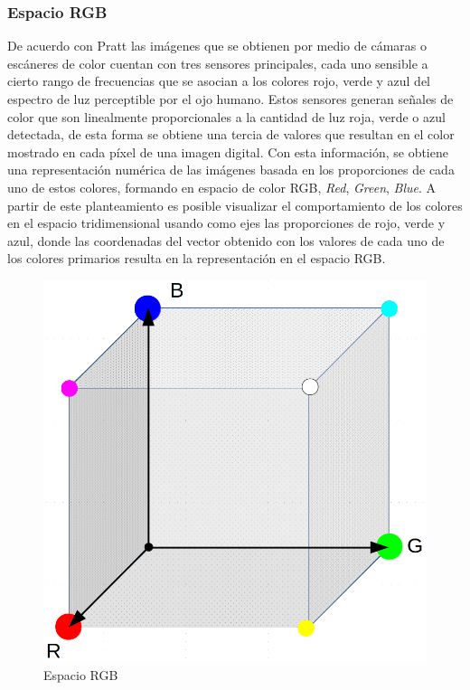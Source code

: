 \subsubsection{Espacio RGB}
De acuerdo con Pratt \cite{pratt_introduction_2014} las imágenes que se obtienen por medio de cámaras o escáneres de color cuentan con tres sensores principales, cada uno sensible a cierto rango de frecuencias que se asocian a los colores rojo, verde y azul del espectro de luz perceptible por el ojo humano. Estos sensores generan señales de color que son linealmente proporcionales a la cantidad de luz roja, verde o azul  detectada, de esta forma se obtiene una tercia de valores que resultan en el color mostrado en cada píxel de una imagen digital. Con esta información, se obtiene una representación numérica de las imágenes basada en los proporciones de cada uno de estos colores, formando en espacio de color RGB, \textit{Red}, \textit{Green}, \textit{Blue}. A partir de este planteamiento es posible visualizar el comportamiento de los colores en el espacio tridimensional usando como ejes las proporciones de rojo, verde y azul, donde las coordenadas del vector obtenido con los valores de cada uno de los colores primarios resulta en la representación en el espacio RGB.

\begin{figure}[H]
\centering
\includegraphics[scale=0.18]{Figures/CuboRGB.png}
    \caption{Espacio RGB}
    \label{fig:RGB_Space}
\end{figure}

